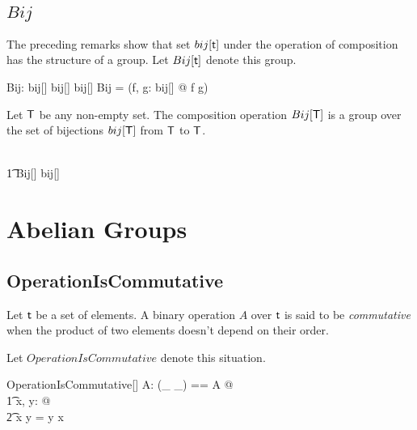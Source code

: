 \documentclass[11pt, oneside]{article}
\begin{document}
\subsection{$Bij$}

The preceding remarks show that set $bij[\mathsf{t}]$ under the operation of composition has the structure of a group.
Let $Bij[\mathsf{t}]$ denote this group.

\begin{gendef}[\genT]
	Bij: bij[\genT] \cross bij[\genT] \fun bij[\genT]
\where
	Bij = (\lambda f, g: bij[\genT] @ f \circ g)
\end{gendef}

\begin{example}
Let $\mathsf{T}$ be any non-empty set.
The composition operation $Bij[\mathsf{T}]$ is a group over the set of bijections $bij[\mathsf{T}]$ from $\mathsf{T}$ to $\mathsf{T}$.

\begin{zed}
\setT \neq \emptyset \implies \\
\t1	Bij[\setT] \in \group bij[\setT]
\end{zed}

\end{example}

\section{Abelian Groups}

\subsection{OperationIsCommutative}

Let $\mathsf{t}$ be a set of elements.
A binary operation $A$ over $\mathsf{t}$ is said to be {\em commutative} when the product of two elements doesn't depend on 
their order.

Let $OperationIsCommutative$ denote this situation.

\begin{schema}{OperationIsCommutative}[\genT]
A: \binop \genT
\where
\LET (\_ \mulG \_) == A @ \\
\t1	\forall x, y: \genT @ \\
\t2		x \mulG y = y \mulG x
\end{schema}

\subsection{}
\end{document}
